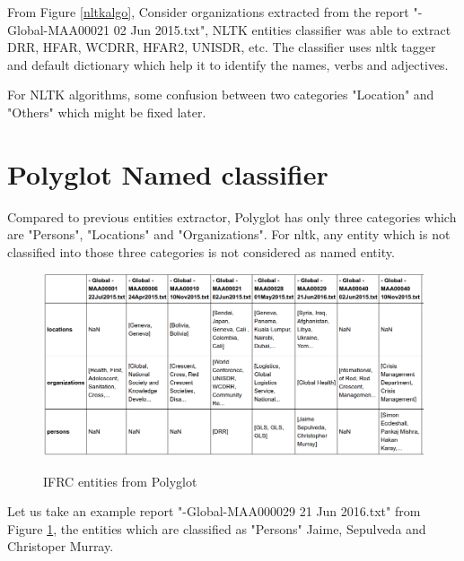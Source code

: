 From Figure \ref{nltkalgo}, Consider organizations extracted from the report "-Global-MAA00021 02 Jun 2015.txt", NLTK entities classifier was able to extract DRR, HFAR, WCDRR, HFAR2, UNISDR, etc. The classifier uses nltk tagger and default dictionary which help it to identify the names, verbs and adjectives.

For NLTK algorithms, some confusion between two categories "Location" and "Others" which might be fixed later.

\section{Polyglot Named classifier}

Compared to previous entities extractor, Polyglot has only three categories which are "Persons", "Locations" and "Organizations". For nltk, any entity which is not classified into those three categories is not considered as named entity.
\newpage

\begin{figure}[hbtp]
\caption{IFRC entities from Polyglot}
\centering
\includegraphics[scale=.5]{images/polyglot.png}\label{polyglot}
\end{figure}
Let us take an example report "-Global-MAA000029 21 Jun 2016.txt" from Figure \ref{polyglot}, the entities which are classified as "Persons" Jaime, Sepulveda and  Christoper Murray.




